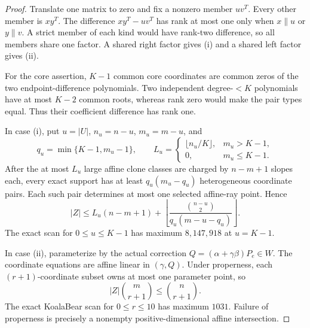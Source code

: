 \begin{proof}
Translate one matrix to zero and fix a nonzero member \(uv^T\).
Every other member is \(xy^T\).  The difference \(xy^T-uv^T\) has rank at
most one only when \(x\parallel u\) or \(y\parallel v\).  A strict member
of each kind would have rank-two difference, so all members share one
factor.  A shared right factor gives \textup{(i)} and a shared left factor
gives \textup{(ii)}.

For the core assertion, \(K-1\) common core coordinates are common zeros of
the two endpoint-difference polynomials.  Two independent degree-\(<K\)
polynomials have at most \(K-2\) common roots, whereas rank zero would make
the pair types equal.  Thus their coefficient difference has rank one.

In case \textup{(i)}, put \(u=|U|\),
\(n_u=n-u\), \(m_u=m-u\), and
\[
 q_u=\min\{K-1,m_u-1\},\qquad
 L_u=\begin{cases}
 \lfloor n_u/K\rfloor,&m_u>K-1,\\
 0,&m_u\le K-1.
 \end{cases}
\]
After the at most \(L_u\) large affine clone classes are charged by
\(n-m+1\) slopes each, every exact support has at least
\(q_u(m_u-q_u)\) heterogeneous coordinate pairs.  Each such pair
determines at most one selected affine-ray point.  Hence
\[
 |Z|\le
 L_u(n-m+1)+
 \left\lfloor
 \frac{\binom{n-u}{2}}{q_u(m-u-q_u)}
 \right\rfloor.
\]
The exact scan for \(0\le u\le K-1\) has maximum \(8{,}147{,}918\) at
\(u=K-1\).

In case \textup{(ii)}, parameterize by the actual correction
\(Q=(\alpha+\gamma\beta)P_e\in W\).  The coordinate equations are affine
linear in \((\gamma,Q)\).  Under properness, each \((r+1)\)-coordinate
subset owns at most one parameter point, so
\[
 |Z|\binom m{r+1}\le\binom n{r+1}.
\]
The exact KoalaBear scan for \(0\le r\le10\) has maximum \(1031\).
Failure of properness is precisely a nonempty positive-dimensional affine
intersection.
\end{proof}
